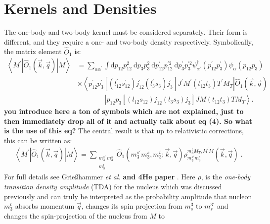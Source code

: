 \documentclass[a4paper,11pt]{article}
\newcommand{\etal}{\textit{et al.}}
\newcommand\bv[1]{\vec{#1}}
\newcommand{\com}[1]{\color{blue}\small\textbf{ #1 }\color{black}\normalsize}
\begin{document}
\section{Kernels and Densities}
The one-body and two-body kernel must be considered separately.
Their form is different, and they require a one- and
two-body density respectively.
Symbolically, the matrix element $\hat{O}_1$ is:
\begin{align}
  \left\langle M^{\prime}\left|\hat{O}_{1}(\bv{k}, \bv{q})\right|
  M\right\rangle&=\sum_{\alpha \alpha^{\prime}} \int \mathrm{d}
  p_{12} p_{12}^{2} \mathrm{~d} p_{3} p_{3}^{2} \mathrm{~d}
  p_{12}^{\prime} p_{12}^{\prime 2} \mathrm{~d} p_{3}^{\prime}
  p_{3}^{\prime 2}
  \psi_{\alpha^{\prime}}^{\dagger}\left(p_{12}^{\prime}
  p_{3}^{\prime}\right) \psi_{\alpha}\left(p_{12} p_{3}\right)\nonumber \\
  &\times\left\langle p_{12}^{\prime}
  p_{3}^{\prime}\left[\left(l_{12}^{\prime} s_{12}^{\prime}\right)
    j_{12}^{\prime}\left(l_{3}^{\prime} s_{3}\right)
  j_{3}^{\prime}\right] J^{\prime} M^{\prime}\left(t_{12}^{\prime}
  t_{3}\right) T^{\prime} M_{T}\right| \hat{O}_{1}(\bv{k}, \bv{q})
  \label{onebodFull}\\
  &\qquad\qquad\left|p_{12} p_{3}\left[\left(l_{12} s_{12}\right)
  j_{12}\left(l_{3} s_{3}\right) j_{3}\right] J M\left(t_{12}
  t_{3}\right) T M_{T}\right\rangle.\nonumber
\end{align}\com{you introduce here a ton of symbols which are not explained, just to then immediately drop all of it and actually talk about eq (4). So what is the use of this eq?}
The central result is that up to relativistic corrections, this can
be written as:
\begin{align}
  \left\langle M^{\prime}\left|\hat{O}_{1}(\bv{k}, \bv{q})\right|
  M\right\rangle=\sum_{\substack{m_{3}^{s \prime}\,
  m_{3}^{s}\\m_3^t}}\hat{O}_{1}\left(m_{3}^{s \prime} m_{3}^{s},
  m_{3}^{t} ;  \bv{k}, \bv{q}\right) \rho_{m_{3}^{s \prime}
  m_{3}^{s}}^{m_3^{t} M_{T}, M^{\prime} M}(\bv{k}, \bv{q})\label{onebodyOrig}\;.
\end{align}
For full details see Grie{\ss}hammer \etal\cite{hammer2020}\com{and 4He paper}.
Here $\rho$, is the \textit{one-body transition density amplitude} (TDA)
for the nucleus which was discussed previously and can truly be
interpreted as the probability amplitude that nucleon $m_3^t$ absorbs
momentum $\bv{q}$, changes its spin projection from $m_s^3$ to
$m_s^{3'}$ and changes the spin-projection of the nucleus from $M$ to
\end{document}
